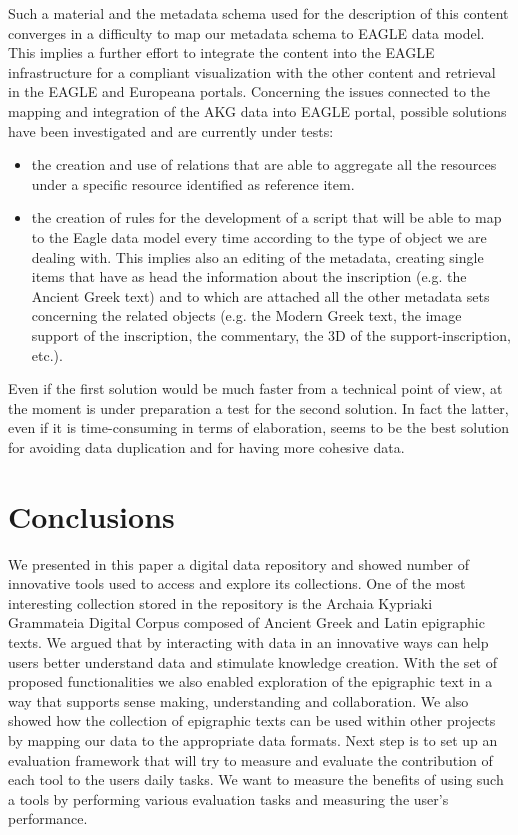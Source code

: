 \documentclass[amsthm,ebook]{saparticle}
\begin{document}
Such a material and the metadata schema used for the description of this content converges in a difficulty to map our
metadata schema to EAGLE data model. This implies a further effort to integrate the content into the EAGLE
infrastructure for a compliant visualization with the other content and retrieval in the EAGLE and Europeana portals.
Concerning the issues connected to the mapping and integration of the AKG data into EAGLE portal, possible solutions
have been investigated and are currently under tests:

\begin{itemize}
\item the creation and use of relations that are able to aggregate all the resources under a specific resource
identified as reference item.
\item the creation of rules for the development of a script that will be able to map to the Eagle data model every time
according to the type of object we are dealing with. This implies also an editing of the metadata, creating single
items that have as head the information about the inscription (e.g. the Ancient Greek text) and to which are attached
all the other metadata sets concerning the related objects (e.g. the Modern Greek text, the image support of the
inscription, the commentary, the 3D of the support-inscription, etc.).
\end{itemize}
Even if the first solution would be much faster from a technical point of view, at the moment is under preparation a
test for the second solution. In fact the latter, even if it is time-consuming in terms of elaboration, seems to be the
best solution for avoiding data duplication and for having more cohesive data. 

\section{Conclusions}


We presented in this paper a digital data repository and showed number of innovative tools used to access and explore
its collections. One of the most interesting collection stored in the repository is the Archaia Kypriaki Grammateia
Digital Corpus composed of Ancient Greek and Latin epigraphic texts. We argued that by interacting with data in an
innovative ways can help users better understand data and stimulate knowledge creation. With the set of proposed
functionalities we also enabled exploration of the epigraphic text in a way that supports sense making, understanding
and collaboration. We also showed how the collection of epigraphic texts can be used within other projects by mapping
our data to the appropriate data formats. Next step is to set up an evaluation framework that will try to measure and
evaluate the contribution of each tool to the users daily tasks. We want to measure the benefits of using such a tools
by performing various evaluation tasks and measuring the user's performance. 




\end{document}
